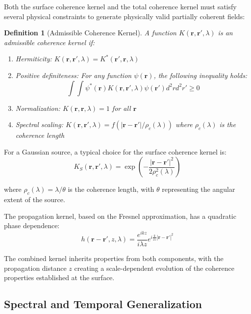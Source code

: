 \documentclass[a4paper,12pt]{article}
\newtheorem{definition}[theorem]{Definition}
\begin{document}
Both the surface coherence kernel and the total coherence kernel must satisfy several physical constraints to generate physically valid partially coherent fields:

\begin{definition}[Admissible Coherence Kernel]
A function $K(\bm{r}, \bm{r}', \lambda)$ is an admissible coherence kernel if:
\begin{enumerate}
\item Hermiticity: $K(\bm{r}, \bm{r}', \lambda) = K^*(\bm{r}', \bm{r}, \lambda)$
\item Positive definiteness: For any function $\psi(\bm{r})$, the following inequality holds:
\begin{equation}
\int \int \psi^*(\bm{r}) K(\bm{r}, \bm{r}', \lambda) \psi(\bm{r}') d^2r d^2r' \geq 0
\end{equation}
\item Normalization: $K(\bm{r}, \bm{r}, \lambda) = 1$ for all $\bm{r}$
\item Spectral scaling: $K(\bm{r}, \bm{r}', \lambda) = f(|\bm{r} - \bm{r}'|/\rho_c(\lambda))$ where $\rho_c(\lambda)$ is the coherence length
\end{enumerate}
\end{definition}

For a Gaussian source, a typical choice for the surface coherence kernel is:
\begin{equation}
K_S(\bm{r}, \bm{r}', \lambda) = \exp\left(-\frac{|\bm{r} - \bm{r}'|^2}{2\rho_c^2(\lambda)}\right)
\end{equation}

where $\rho_c(\lambda) = \lambda/\theta$ is the coherence length, with $\theta$ representing the angular extent of the source.

The propagation kernel, based on the Fresnel approximation, has a quadratic phase dependence:
\begin{equation}
h(\bm{r} - \bm{r}', z, \lambda) = \frac{e^{ikz}}{i\lambda z} e^{i\frac{k}{2z}|\bm{r} - \bm{r}'|^2}
\end{equation}

The combined kernel inherits properties from both components, with the propagation distance $z$ creating a scale-dependent evolution of the coherence properties established at the surface.

\subsection{Spectral and Temporal Generalization}
\end{document}
